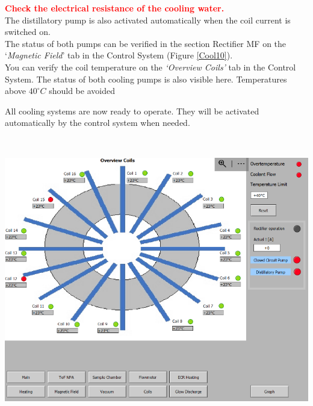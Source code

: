 \documentclass[fleqn,a4paper,20pt]{article}
\begin{document}
\begin{minipage}{.3\textwidth}
\textcolor{red}{\textbf{Check the electrical resistance of the cooling water.}}\\
	
The distillatory pump is also activated automatically when the coil current is switched on.\\

The status of both pumps can be verified in the section Rectifier MF on the `\textit{Magnetic Field}' tab in the Control System (Figure \ref{Cool10}).\\
	
You can verify the coil temperature on the \textit{`Overview Coils'} tab in the Control System. The status of both cooling pumps is also visible here. Temperatures above $40^\circ C$ should be avoided
	
	
	
All cooling systems are now ready to operate. They will be activated automatically by the control system when needed. 
\end{minipage}
\begin{minipage}{.02\textwidth}
$\ $\\
\end{minipage}
\begin{minipage}{.68\textwidth}
\centering
\includegraphics[width=0.95\linewidth]{Coil}
\captionsetup{width=0.75\textwidth}
\label{Coil}
\end{minipage}
\end{document}
